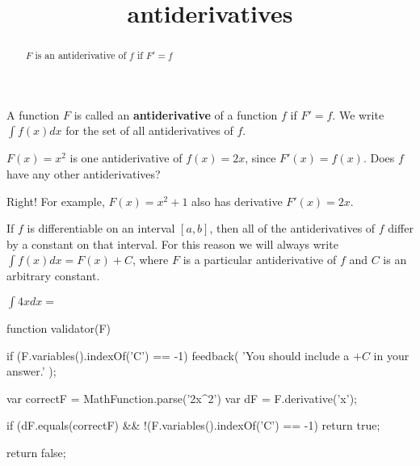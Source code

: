 \documentclass{ximera}
\title{antiderivatives}
\begin{document}
\begin{abstract}
  $F$ is an antiderivative of $f$ if $F'=f$
\end{abstract}

\maketitle

\begin{definition}
	A function $F$ is called an \textbf{antiderivative} of a function $f$ if $F' = f$.  We write $\int f(x) dx$ for the set of all antiderivatives of $f$.
\end{definition}

\begin{question}
	$F(x) = x^2$ is one antiderivative of $f(x) = 2x$, since $F'(x) = f(x)$.  Does $f$ have any other antiderivatives?
\begin{solution}
	 \begin{multipleChoice}
    	\end{multipleChoice}  
  \end{solution}
  
  Right!  For example, $F(x) = x^2+1$ also has derivative $F'(x) = 2x$.
\end{question}

\begin{theorem}
	If $f$ is differentiable on an interval $[a,b]$, then all of the antiderivatives of $f$ differ by a constant on that interval.  For this reason we will always write $\int f(x) dx  = F(x)+C$, where $F$ is a particular antiderivative of $f$ and $C$ is an arbitrary constant.
\end{theorem}

\begin{question}
 	$\int 4x dx = $ 
	\begin{expression-answer}
  function validator(F) {
    if (F.variables().indexOf('C') == -1) {
      feedback( 'You should include a $+C$ in your answer.' );
    }
    
    var correctF = MathFunction.parse('2x^2')
    var dF = F.derivative('x');
    
    if (dF.equals(correctF) && !(F.variables().indexOf('C') == -1){
    	return true;
	}
   
    return false;
  }
\end{expression-answer}
	
	
\end{question}
\end{document}
